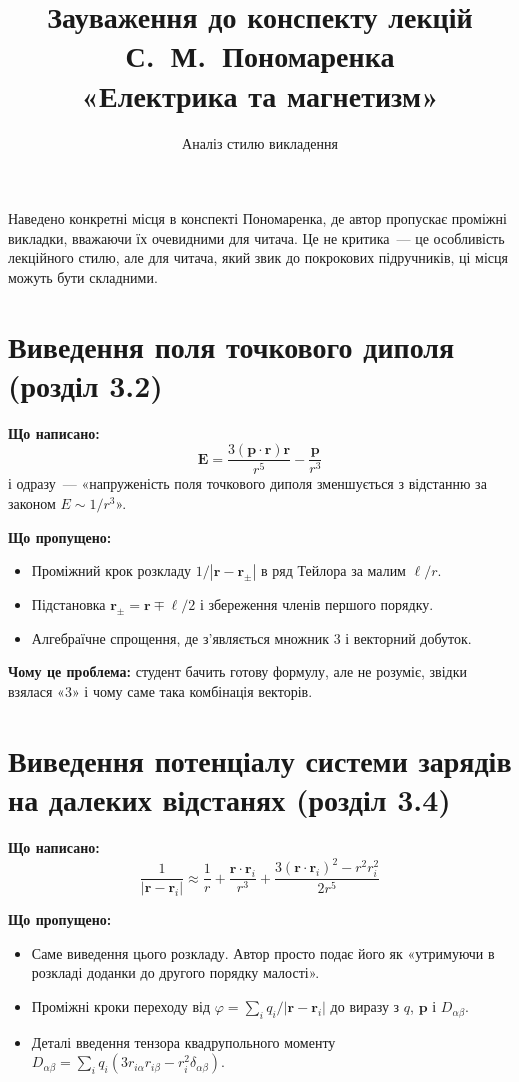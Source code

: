 \documentclass[11pt,a4paper]{article}
\title{Зауваження до конспекту лекцій С.~М.~Пономаренка\\«Електрика та магнетизм»}
\author{Аналіз стилю викладення}
\date{}
\begin{document}
\maketitle

\noindent
Наведено конкретні місця в конспекті Пономаренка, де автор пропускає проміжні викладки, вважаючи їх очевидними для читача. Це не критика~--- це особливість лекційного стилю, але для читача, який звик до покрокових підручників, ці місця можуть бути складними.

\section{Виведення поля точкового диполя (розділ 3.2)}

\textbf{Що написано:}
\[
\mathbf{E} = \frac{3(\mathbf{p} \cdot \mathbf{r})\mathbf{r}}{r^5} - \frac{\mathbf{p}}{r^3}
\]
і одразу~--- «напруженість поля точкового диполя зменшується з відстанню за законом \(E \sim 1/r^3\)».

\textbf{Що пропущено:}
\begin{itemize}[nosep]
    \item Проміжний крок розкладу \(1/|\mathbf{r} - \mathbf{r}_\pm|\) в ряд Тейлора за малим \(\ell/r\).
    \item Підстановка \(\mathbf{r}_\pm = \mathbf{r} \mp \boldsymbol{\ell}/2\) і збереження членів першого порядку.
    \item Алгебраїчне спрощення, де з'являється множник \(3\) і векторний добуток.
\end{itemize}

\textbf{Чому це проблема:} студент бачить готову формулу, але не розуміє, звідки взялася «3» і чому саме така комбінація векторів.

\section{Виведення потенціалу системи зарядів на далеких відстанях (розділ 3.4)}

\textbf{Що написано:}
\[
\frac{1}{|\mathbf{r} - \mathbf{r}_i|} \approx \frac{1}{r} + \frac{\mathbf{r} \cdot \mathbf{r}_i}{r^3} + \frac{3(\mathbf{r} \cdot \mathbf{r}_i)^2 - r^2 r_i^2}{2r^5}
\]

\textbf{Що пропущено:}
\begin{itemize}[nosep]
    \item Саме виведення цього розкладу. Автор просто подає його як «утримуючи в розкладі доданки до другого порядку малості».
    \item Проміжні кроки переходу від \(\varphi = \sum_i q_i/|\mathbf{r} - \mathbf{r}_i|\) до виразу з \(q\), \(\mathbf{p}\) і \(D_{\alpha\beta}\).
    \item Деталі введення тензора квадрупольного моменту \(D_{\alpha\beta} = \sum_i q_i(3r_{i\alpha}r_{i\beta} - r_i^2 \delta_{\alpha\beta})\).
\end{itemize}
\end{document}
